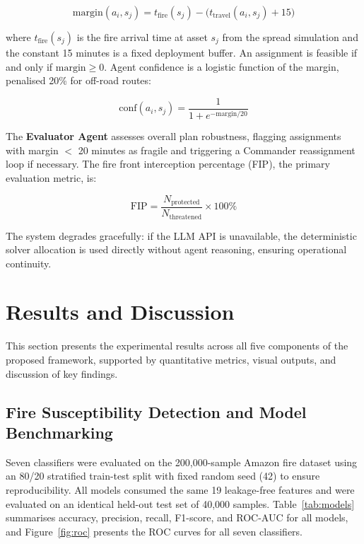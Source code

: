 \documentclass[12pt,a4paper]{article}
\begin{document}
\begin{equation}
\text{margin}(a_i, s_j) = t_{\text{fire}}(s_j) - \bigl(t_{\text{travel}}(a_i, s_j) + 15\bigr)
\end{equation}

where $t_{\text{fire}}(s_j)$ is the fire arrival time at asset $s_j$ from the spread simulation and the constant 15 minutes is a fixed deployment buffer. An assignment is feasible if and only if $\text{margin} \geq 0$. Agent confidence is a logistic function of the margin, penalised 20\% for off-road routes:

\begin{equation}
\text{conf}(a_i, s_j) = \frac{1}{1 + e^{-\text{margin}/20}}
\end{equation}

The \textbf{Evaluator Agent} assesses overall plan robustness, flagging assignments with margin $<$ 20 minutes as fragile and triggering a Commander reassignment loop if necessary. The fire front interception percentage (FIP), the primary evaluation metric, is:

\begin{equation}
\text{FIP} = \frac{N_{\text{protected}}}{N_{\text{threatened}}} \times 100\%
\end{equation}

The system degrades gracefully: if the LLM API is unavailable, the deterministic solver allocation is used directly without agent reasoning, ensuring operational continuity.

\section{Results and Discussion}

This section presents the experimental results across all five components of the proposed framework, supported by quantitative metrics, visual outputs, and discussion of key findings.

\subsection{Fire Susceptibility Detection and Model Benchmarking}

Seven classifiers were evaluated on the 200,000-sample Amazon fire dataset using an 80/20 stratified train-test split with fixed random seed (42) to ensure reproducibility. All models consumed the same 19 leakage-free features and were evaluated on an identical held-out test set of 40,000 samples. Table~\ref{tab:models} summarises accuracy, precision, recall, F1-score, and ROC-AUC for all models, and Figure~\ref{fig:roc} presents the ROC curves for all seven classifiers.
\end{document}

